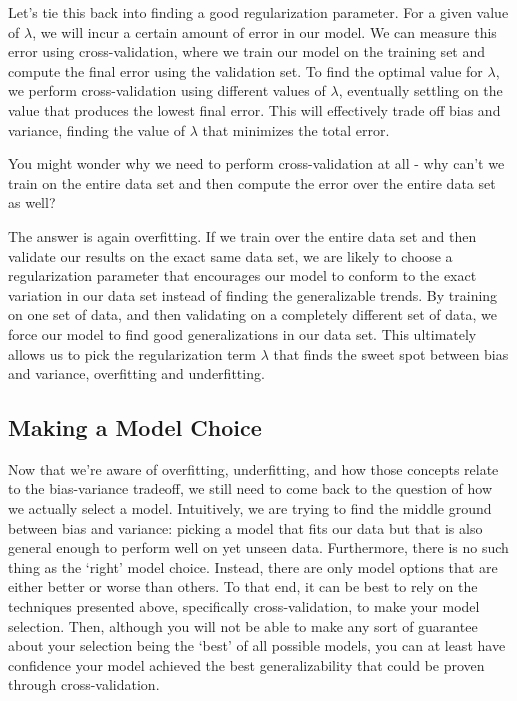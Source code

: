 Let's tie this back into finding a good regularization parameter. For a given value of $\lambda$, we will incur a certain amount of error in our model. We can measure this error using cross-validation, where we train our model on the training set and compute the final error using the validation set. To find the optimal value for $\lambda$, we perform cross-validation using different values of $\lambda$, eventually settling on the value that produces the lowest final error. This will effectively trade off bias and variance, finding the value of $\lambda$ that minimizes the total error.

You might wonder why we need to perform cross-validation at all - why can't we train on the entire data set and then compute the error over the entire data set as well?

The answer is again overfitting. If we train over the entire data set and then validate our results on the exact same data set, we are likely to choose a regularization parameter that encourages our model to conform to the exact variation in our data set instead of finding the generalizable trends. By training on one set of data, and then validating on a completely different set of data, we force our model to find good generalizations in our data set. This ultimately allows us to pick the regularization term $\lambda$ that finds the sweet spot between bias and variance, overfitting and underfitting.

\subsection{Making a Model Choice}
Now that we're aware of overfitting, underfitting, and how those concepts relate to the bias-variance tradeoff, we still need to come back to the question of how we actually select a model. Intuitively, we are trying to find the middle ground between bias and variance: picking a model that fits our data but that is also general enough to perform well on yet unseen data. Furthermore, there is no such thing as the `right' model choice. Instead, there are only model options that are either better or worse than others. To that end, it can be best to rely on the techniques presented above, specifically cross-validation, to make your model selection. Then, although you will not be able to make any sort of guarantee about your selection being the `best' of all possible models, you can at least have confidence your model achieved the best generalizability that could be proven through cross-validation.


